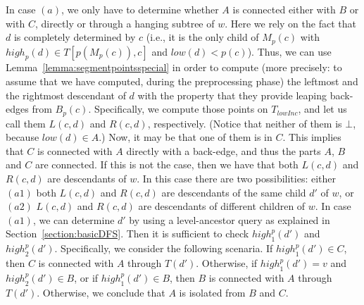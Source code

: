 \documentclass[11pt,a4paper]{article}
\begin{document}
In case $(a)$, we only have to determine whether $A$ is connected either with $B$ or with $C$, directly or through a hanging subtree of $w$. Here we rely on the fact that $d$ is completely determined by $c$ (i.e., it is the only child of $M_p(c)$ with $\mathit{high}_p(d)\in T[p(M_p(c)),c]$ and $\mathit{low}(d)<p(c)$). Thus, we can use Lemma~\ref{lemma:segmentpointsspecial} in order to compute (more precisely: to assume that we have computed, during the preprocessing phase) the leftmost and the rightmost descendant of $d$ with the property that they provide leaping back-edges from $B_p(c)$. Specifically, we compute those points on $T_\mathit{lowInc}$, and let us call them $L(c,d)$ and $R(c,d)$, respectively. (Notice that neither of them is $\bot$, because $\mathit{low}(d)\in A$.) Now, it may be that one of them is in $C$. This implies that $C$ is connected with $A$ directly with a back-edge, and thus the parts $A$, $B$ and $C$ are connected. If this is not the case, then we have that both $L(c,d)$ and $R(c,d)$ are descendants of $w$. In this case there are two possibilities: either $(a1)$ both $L(c,d)$ and $R(c,d)$ are descendants of the same child $d'$ of $w$, or $(a2)$ $L(c,d)$ and $R(c,d)$ are descendants of different children of $w$. In case $(a1)$, we can determine $d'$ by using a level-ancestor query as explained in Section~\ref{section:basicDFS}. Then it is sufficient to check $\mathit{high}^p_1(d')$ and $\mathit{high}^p_2(d')$. Specifically, we consider the following scenaria. If $\mathit{high}^p_1(d')\in C$, then $C$ is connected with $A$ through $T(d')$. Otherwise, if $\mathit{high}^p_1(d')=v$ and $\mathit{high}^p_2(d')\in B$, or if $\mathit{high}^p_1(d')\in B$, then $B$ is connected with $A$ through $T(d')$. Otherwise, we conclude that $A$ is isolated from $B$ and $C$. 
\end{document}
